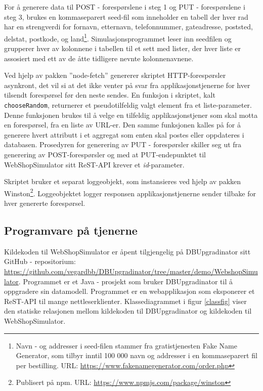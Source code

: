 For å generere data til POST - forespørslene i steg 1 og PUT - forespørslene i steg 3, brukes en komma\-separert seed-fil som inneholder en tabell der hver rad har en strengverdi for fornavn, etternavn, telefonnummer, gateadresse, poststed, delstat, postkode, og land\footnote{Navn - og addresser i seed-filen stammer fra gratistjenesten Fake Name Generator, som tilbyr inntil 100 000 navn og addresser i en kommaseparert fil per bestilling. URL: \url{https://www.fakenamegenerator.com/order.php}}. Simulasjonsprogrammet leser inn seedfilen og grupperer hver av kolonnene i tabellen til et sett med lister, der hver liste er assosiert med ett av de åtte tidligere nevnte kolonnenavnene.

Ved hjelp av pakken ''node-fetch'' genererer skriptet HTTP-forespørsler asynkront, det vil si at det ikke venter på svar fra applikasjonstjenerne for hver tilsendt forespørsel før den neste sendes. En funksjon i skriptet, kalt \texttt{chooseRandom}, returnerer et pseudotilfeldig valgt element fra et liste-parameter. Denne funksjonen brukes til å velge en tilfeldig applikasjonstjener som skal motta en forespørsel, fra en liste av URL-er. Den samme funksjonen kalles på for å generere hvert attributt i et aggregat som enten skal postes eller oppdateres i databasen. Prosedyren for generering av PUT - forespørsler skiller seg ut fra generering av POST-forespørsler og med at PUT-endepunktet til WebShopSimulator sitt ReST-API krever et \emph{id}-parameter.

Skriptet bruker et separat loggeobjekt, som instansieres ved hjelp av pakken Winston\footnote{Publisert på npm. URL: \url{https://www.npmjs.com/package/winston}}. Loggeobjektet logger responsen applikasjonstjenerne sender tilbake for hver genererte forespørsel.

\subsection{Programvare på tjenerne}

Kildekoden til WebShopSimulator er åpent tilgjengelig på DBUpgradinator sitt GitHub - repositorium: \url{https://github.com/vegardbb/DBUpgradinator/tree/master/demo/WebshopSimulator}. Programmet er et Java - prosjekt som bruker DBUpgradinator til å oppgradere sin datamodell. Programmet er en webapplikasjon som eksponerer et ReST-API til mange nettleserklienter. Klassediagrammet i figur \ref{classfig} viser den statiske relasjonen mellom kildekoden til DBUpgradinator og kildekoden til WebShopSimulator.

